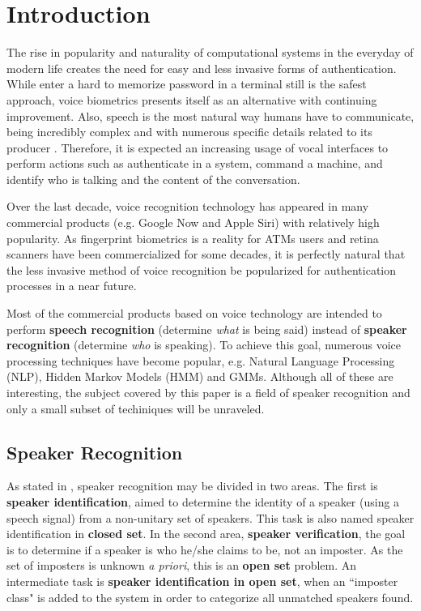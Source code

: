 \chapter{Introduction}

The rise in popularity and naturality of computational systems in the everyday of modern life creates the need for easy and less invasive forms of authentication. While enter a hard to memorize password in a terminal still is the safest approach, voice biometrics presents itself as an alternative with continuing improvement. Also, speech is the most natural way humans have to communicate, being incredibly complex and with numerous specific details related to its producer \autocite{bimbot.et.al.2004}. Therefore, it is expected an increasing usage of vocal interfaces to perform actions such as authenticate in a system, command a machine, and identify who is talking and the content of the conversation.

Over the last decade, voice recognition technology has appeared in many commercial products (e.g. Google Now and Apple Siri) with relatively high popularity. As fingerprint biometrics is a reality for ATMs users and retina scanners have been commercialized for some decades, it is perfectly natural that the less invasive method of voice recognition be popularized for authentication processes in a near future.

Most of the commercial products based on voice technology are intended to perform \textbf{speech recognition} (determine \emph{what} is being said) instead of \textbf{speaker recognition} (determine \emph{who} is speaking). To achieve this goal, numerous voice processing techniques have become popular, e.g. Natural Language Processing (NLP), Hidden Markov Models (HMM) and GMMs. Although all of these are interesting, the subject covered by this paper is a field of speaker recognition and only a small subset of techiniques will be unraveled.

\section{Speaker Recognition}

As stated in \autocite{pinheiro.2013}, speaker recognition may be divided in two areas. The first is \textbf{speaker identification}, aimed to determine the identity of a speaker (using a speech signal) from a non-unitary set of speakers. This task is also named speaker identification in \textbf{closed set}. In the second area, \textbf{speaker verification}, the goal is to determine if a speaker is who he/she claims to be, not an imposter. As the set of imposters is unknown \emph{a priori}, this is an \textbf{open set} problem. An intermediate task is \textbf{speaker identification in open set}, when an ``imposter class" is added to the system in order to categorize all unmatched speakers found.

